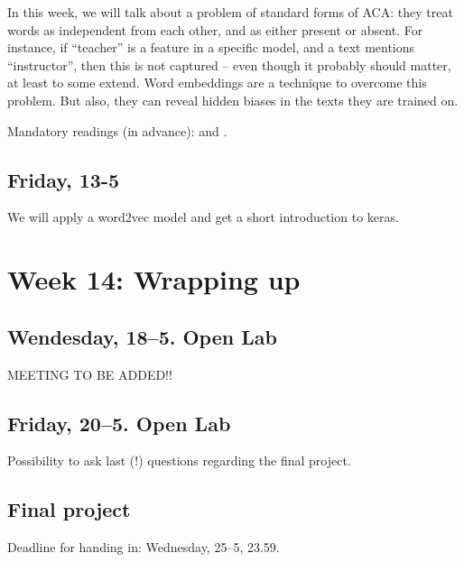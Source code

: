 In this week, we will talk about a problem of standard forms of ACA: they treat words as independent from each other, and as either present or absent. For instance, if ``teacher'' is a feature in a specific model, and a text mentions ``instructor'', then this is not captured -- even though it probably should matter, at least to some extend. Word embeddings are a technique to overcome this problem. But also, they can reveal hidden biases in the texts they are trained on.

Mandatory readings (in advance): \cite{Kusner2015} and \cite{Garg2017}.


\subsection*{Friday, 13-5}
We will apply a word2vec model and get a short introduction to keras.




\section*{Week 14: Wrapping up}

\subsection*{Wendesday, 18--5. Open Lab}
MEETING TO BE ADDED!!

\subsection*{Friday, 20--5. Open Lab}
Possibility to ask last (!) questions regarding the final project.


\subsection*{Final project}
Deadline for handing in: Wednesday, 25--5, 23.59.
